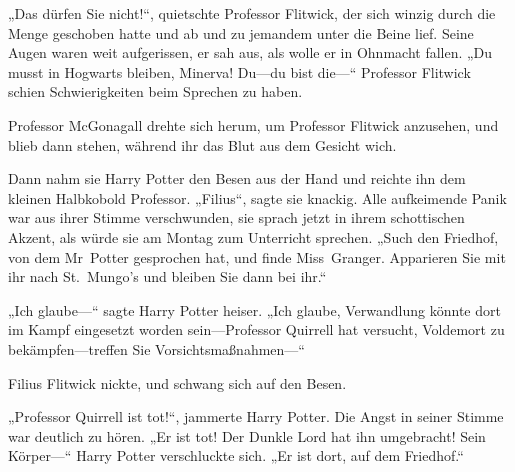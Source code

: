 „Das dürfen Sie nicht!“, quietschte Professor Flitwick, der sich winzig durch die Menge geschoben hatte und ab und zu jemandem unter die Beine lief. Seine Augen waren weit aufgerissen, er sah aus, als wolle er in Ohnmacht fallen.
„Du musst in Hogwarts bleiben, Minerva! Du—du bist die—“
Professor Flitwick schien Schwierigkeiten beim Sprechen zu haben.

Professor McGonagall drehte sich herum, um Professor Flitwick anzusehen, und blieb dann stehen, während ihr das Blut aus dem Gesicht wich.

Dann nahm sie Harry Potter den Besen aus der Hand und reichte ihn dem kleinen Halbkobold Professor.
„Filius“, sagte sie knackig.
Alle aufkeimende Panik war aus ihrer Stimme verschwunden, sie sprach jetzt in ihrem schottischen Akzent, als würde sie am Montag zum Unterricht sprechen.
„Such den Friedhof, von dem Mr~Potter gesprochen hat, und finde Miss~Granger. Apparieren Sie mit ihr nach St.~Mungo’s und bleiben Sie dann bei ihr.“

„Ich glaube—“ sagte Harry Potter heiser. „Ich glaube, Verwandlung könnte dort im Kampf eingesetzt worden sein—Professor Quirrell hat versucht, Voldemort zu bekämpfen—treffen Sie Vorsichtsmaßnahmen—“

Filius Flitwick nickte, und schwang sich auf den Besen.

„Professor Quirrell ist tot!“, jammerte Harry Potter. Die Angst in seiner Stimme war deutlich zu hören.
„Er ist tot! Der Dunkle Lord hat ihn umgebracht! Sein Körper—“ Harry Potter verschluckte sich. „Er ist dort, auf dem Friedhof.“

